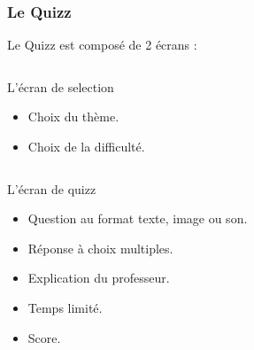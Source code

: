 \begin{frame}
  \frametitle{Le Quizz}
  Le Quizz est composé de 2 écrans :
  \begin{columns}[t]
    \begin{column}{10cm}
      \begin{exampleblock}{L'écran de selection}
	\begin{itemize}
        \item Choix du thème.
        \item Choix de la difficulté.
        \end{itemize}
      \end{exampleblock} 
    \end{column}
  \end{columns}  

  \begin{columns}[t]
    \begin{column}{10cm}
      \begin{exampleblock}{L'écran de quizz}
	\begin{itemize}
        \item Question au format texte, image ou son.
        \item Réponse à choix multiples.
        \item Explication du professeur.
        \item Temps limité.
        \item Score.
        \end{itemize}
      \end{exampleblock} 
    \end{column}
  \end{columns}  
\end{frame}

